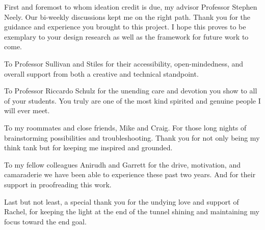 
\setlength{\parskip}{1em}
\setlength{\parindent}{0em}

\noindent
First and foremost to whom ideation credit is due, my advisor Professor Stephen Neely. Our bi-weekly discussions kept me on the right path. Thank you for the guidance and experience you brought to this project. I hope this proves to be exemplary to your design research as well as the framework for future work to come.

To Professor Sullivan and Stiles for their accessibility, open-mindedness, and overall support from both a creative and technical standpoint.

To Professor Riccardo Schulz for the unending care and devotion you show to all of your students. You truly are one of the most kind spirited and genuine people I will ever meet.

To my roommates and close friends, Mike and Craig. For those long nights of brainstorming possibilities and troubleshooting. Thank you for not only being my think tank but for keeping me inspired and grounded.

To my fellow colleagues Anirudh and Garrett for the drive, motivation, and camaraderie we have been able to experience these past two years. And for their support in proofreading this work.

Last but not least, a special thank you for the undying love and support of Rachel, for keeping the light at the end of the tunnel shining and maintaining my focus toward the end goal.